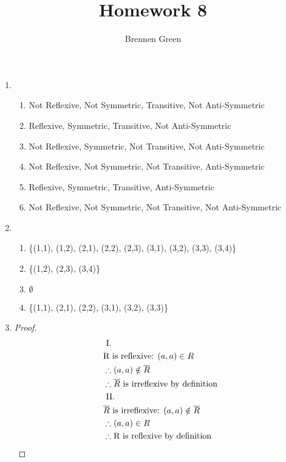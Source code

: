 \documentclass[11pt]{article}
\begin{document}
\title{Homework 8}
\author{Brennen Green}
\maketitle


\begin{enumerate}
    \item \begin{enumerate}
        \item Not Reflexive, Not Symmetric, Transitive, Not Anti-Symmetric
        \item Reflexive, Symmetric, Transitive, Not Anti-Symmetric
        \item Not Reflexive, Symmetric, Not Transitive, Not Anti-Symmetric
        \item Not Reflexive, Not Symmetric, Not Transitive, Anti-Symmetric
        \item Reflexive, Symmetric, Transitive, Anti-Symmetric
        \item Not Reflexive, Not Symmetric, Not Transitive, Not Anti-Symmetric
    \end{enumerate}
    \item \begin{enumerate}
        \item \{(1,1), (1,2), (2,1), (2,2), (2,3), (3,1), (3,2), (3,3), (3,4)\}
        \item \{(1,2), (2,3), (3,4)\}
        \item $\emptyset$
        \item \{(1,1), (2,1), (2,2), (3,1), (3,2), (3,3)\}
    \end{enumerate}
    \item \begin{proof}
        \begin{align*}
            & \text{ I. }\\
            & \text{R is reflexive: } (a, a) \in R \\
            & \therefore (a, a) \notin \overline{R} \\
            & \therefore \overline{R} \text{ is irreflexive by definition} \\
            & \text{ II. } \\
            & \text{$\overline{R}$ is irreflexive: } (a, a) \notin \overline{R} \\
            & \therefore (a,a) \in R \\
            & \therefore \text{R is reflexive by definition} \qedhere
        \end{align*}

\end{proof}
\end{enumerate}
\end{document}

